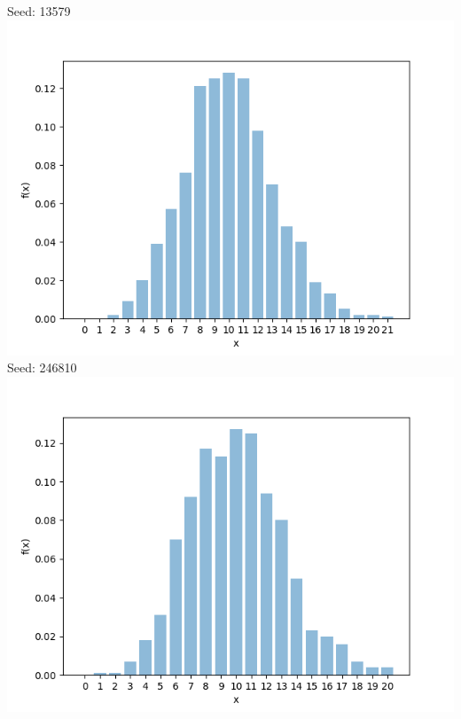 \newpage
Seed: 13579\\
\includegraphics[scale=1]{Sections/Q2/4_2_b_13579.png}\\
\newpage
Seed: 246810\\
\includegraphics[scale=1]{Sections/Q2/4_2_b_246810.png}\\
\newpage


